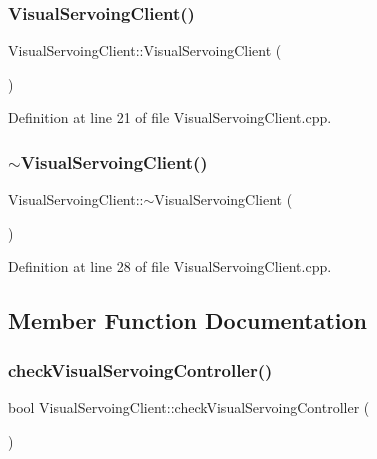 \subsubsection{\texorpdfstring{Visual\+Servoing\+Client()}{VisualServoingClient()}}
{\footnotesize\ttfamily Visual\+Servoing\+Client\+::\+Visual\+Servoing\+Client (\begin{DoxyParamCaption}{ }\end{DoxyParamCaption})}



Definition at line 21 of file Visual\+Servoing\+Client.\+cpp.

\mbox{\label{classVisualServoingClient_ab9d97c68e33a3d3aa5bad80921efd45a}} 
\subsubsection{\texorpdfstring{$\sim$\+Visual\+Servoing\+Client()}{~VisualServoingClient()}}
{\footnotesize\ttfamily Visual\+Servoing\+Client\+::$\sim$\+Visual\+Servoing\+Client (\begin{DoxyParamCaption}{ }\end{DoxyParamCaption})}



Definition at line 28 of file Visual\+Servoing\+Client.\+cpp.



\subsection{Member Function Documentation}
\mbox{\label{classVisualServoingClient_a833cf672981b3a422a0ac41b2845a6c1}} 
\subsubsection{\texorpdfstring{check\+Visual\+Servoing\+Controller()}{checkVisualServoingController()}}
{\footnotesize\ttfamily bool Visual\+Servoing\+Client\+::check\+Visual\+Servoing\+Controller (\begin{DoxyParamCaption}{ }\end{DoxyParamCaption})\hspace{0.3cm}{\ttfamily [override]}}



